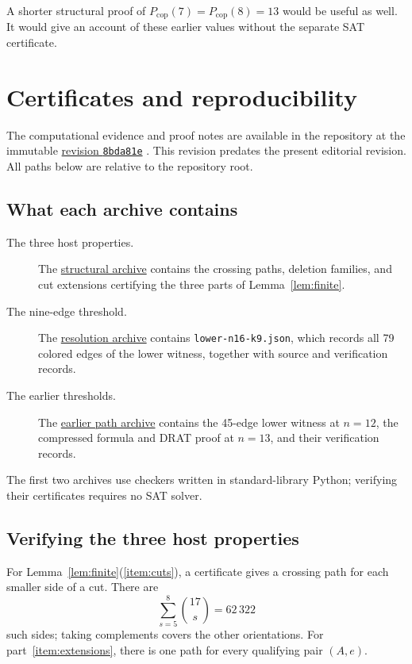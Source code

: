 \documentclass[12pt]{article}
\newcommand{\Pcop}{P_{\mathrm{cop}}}
\newcommand{\repo}{https://github.com/queelius/computational-explorations}
\newcommand{\revision}{8bda81e8d3f867bb1450b0e492592164416ba98f}
\begin{document}
A shorter structural proof of
$\Pcop(7)=\Pcop(8)=13$ would be useful as well.
It would give an account of these earlier values without
the separate SAT certificate.

\appendix
\section{Certificates and reproducibility}\label{sec:evidence}

The computational evidence and proof notes are available in
the repository at the immutable
\href{\repo/tree/\revision}{revision \texttt{8bda81e}}
\cite{repository}. This revision predates the present
editorial revision. All paths below are relative to the
repository root.

\subsection{What each archive contains}

\begin{description}
\item[The three host properties.]
The
\href{\repo/tree/\revision/docs/audits/coprime-path-nine-2026-10-18}
{structural archive}
contains the crossing paths, deletion families, and cut
extensions certifying the three parts of Lemma~\ref{lem:finite}.
\item[The nine-edge threshold.]
The
\href{\repo/tree/\revision/docs/audits/coprime-path-nine-resolution-2026-10-18}
{resolution archive}
contains \texttt{lower-n16-k9.json}, which records all 79
colored edges of the lower witness, together with source
and verification records.
\item[The earlier thresholds.]
The
\href{\repo/tree/\revision/docs/audits/coprime-paths-2026-10-18}
{earlier path archive}
contains the 45-edge lower witness at $n=12$, the compressed
formula and DRAT proof at $n=13$, and their verification records.
\end{description}

The first two archives use checkers written in standard-library
Python; verifying their certificates requires no SAT solver.

\subsection{Verifying the three host properties}

For Lemma~\ref{lem:finite}(\ref{item:cuts}), a certificate
gives a crossing path for each smaller side of a cut. There
are
\[
 \sum_{s=5}^8\binom{17}{s}=62\,322
\]
such sides; taking complements covers the other orientations.
For part~\ref{item:extensions}, there is one path for every
qualifying pair $(A,e)$.
\end{document}
